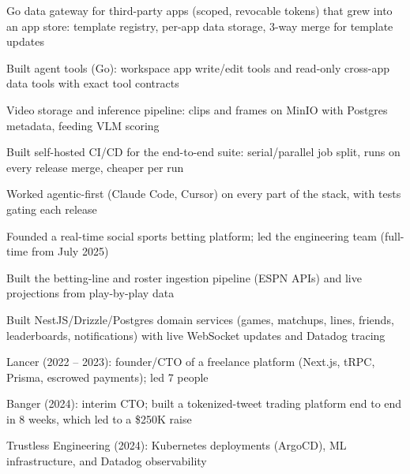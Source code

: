\documentclass[print]{jack-resume}
\begin{document}
\begin{tightemize}
    \item Go data gateway for third-party apps (scoped, revocable tokens) that grew into an app store: template registry, per-app data storage, 3-way merge for template updates
    \item Built agent tools (Go): workspace app write/edit tools and read-only cross-app data tools with exact tool contracts
    \item Video storage and inference pipeline: clips and frames on MinIO with Postgres metadata, feeding VLM scoring
    \item Built self-hosted CI/CD for the end-to-end suite: serial/parallel job split, runs on every release merge, cheaper per run
    \item Worked agentic-first (Claude Code, Cursor) on every part of the stack, with tests gating each release
\end{tightemize}
\sectionsep

\begin{tightemize}
    \item Founded a real-time social sports betting platform; led the engineering team (full-time from July 2025)
    \item Built the betting-line and roster ingestion pipeline (ESPN APIs) and live projections from play-by-play data
    \item Built NestJS/Drizzle/Postgres domain services (games, matchups, lines, friends, leaderboards, notifications) with live WebSocket updates and Datadog tracing
\end{tightemize}
\sectionsep

\begin{tightemize}
    \item Lancer (2022 -- 2023): founder/CTO of a freelance platform (Next.js, tRPC, Prisma, escrowed payments); led 7 people
    \item Banger (2024): interim CTO; built a tokenized-tweet trading platform end to end in 8 weeks, which led to a \$250K raise
    \item Trustless Engineering (2024): Kubernetes deployments (ArgoCD), ML infrastructure, and Datadog observability
\end{tightemize}
\sectionsep
\end{document}
